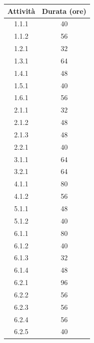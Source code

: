 \begin{table}[H]
    \centering
    \begin{tabular}{|c|c|}
        \hline
        \textbf{Attività} & \textbf{Durata (ore)} \\
        \hline
        1.1.1             & 40                    \\
        1.1.2             & 56                    \\
        1.2.1             & 32                    \\
        1.3.1             & 64                    \\
        1.4.1             & 48                    \\
        1.5.1             & 40                    \\
        1.6.1             & 56                    \\
        2.1.1             & 32                    \\
        2.1.2             & 48                    \\
        2.1.3             & 48                    \\
        2.2.1             & 40                    \\
        3.1.1             & 64                    \\
        3.2.1             & 64                    \\
        4.1.1             & 80                    \\
        4.1.2             & 56                    \\
        5.1.1             & 48                    \\
        5.1.2             & 40                    \\
        6.1.1             & 80                    \\
        6.1.2             & 40                    \\
        6.1.3             & 32                    \\
        6.1.4             & 48                    \\
        6.2.1             & 96                    \\
        6.2.2             & 56                    \\
        6.2.3             & 56                    \\
        6.2.4             & 56                    \\
        6.2.5             & 40                    \\

\end{tabular}
\end{table}
